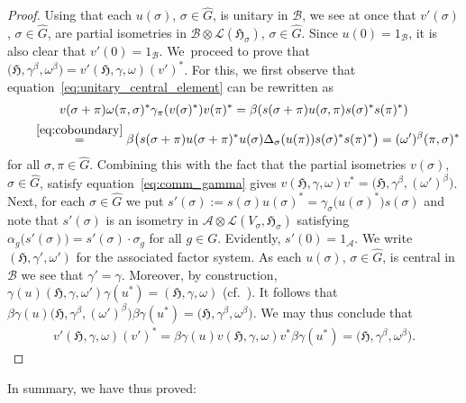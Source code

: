 \documentclass[10pt,a4paper]{amsart}
\numberwithin{equation}{section}
\newcommand*{\tensor}{\otimes}		%
\newcommand*{\hilb}{\mathfrak}		%
\newcommand*{\alg}{\mathcal}		%
\newcommand*{\hH}{\hilb{H}}			%
\newcommand*{\one}{1}				%
\newcommand*{\aA}{\alg{A}}			%
\newcommand*{\aB}{\alg{B}} 			%
\newcommand*{\End}{\mathcal{L}} %
\begin{document}
\begin{proof}
	Using that each $u(\sigma)$, $\sigma \in \hat G$, is unitary in $\aB$, we see at once that $v'(\sigma)$, $\sigma \in \hat G$, are partial isometries in $\aB \tensor \End(\hH_\sigma)$, $\sigma \in \hat G$.
	Since $u(0) = \one_\aB$, it is also clear that $v'(0) = \one_\aB$.
	We~proceed to prove that $\big(\hH, \gamma^\beta, \omega^\beta\big) = v'(\hH, \gamma, \omega)(v')^*$.
	For this, we first observe that equation~\eqref{eq:unitary_central_element} can be rewritten as
	\begin{gather*}
		v(\sigma+\pi) \omega(\pi, \sigma)^* \gamma_\pi ( v(\sigma)^* ) v(\pi)^*
		=
		\beta ( s(\sigma+\pi) u(\sigma, \pi) s(\sigma)^* s(\pi)^* )
		\\
		\qquad{} \overset{\eqref{eq:coboundary}} {=}
		\beta \bigl( s(\sigma+\pi) u(\sigma+\pi)^* u(\sigma) \Delta_\sigma ( u(\pi) ) s(\sigma)^* s(\pi)^* \bigr)
		=
		(\omega')^\beta(\pi, \sigma)^*
	\end{gather*}
	for all $\sigma, \pi \in \hat G$.
	Combining this with the fact that the partial isometries $v(\sigma)$, $\sigma \in \hat G$, satisfy equation~\eqref{eq:comm_gamma} gives $v(\hH, \gamma, \omega)v^* = \bigl( \hH, \gamma^\beta, (\omega')^\beta \bigr)$.
	Next, for each $\sigma \in \hat G$ we put $s'(\sigma) := s(\sigma) u(\sigma)^* = \gamma_\sigma \bigl( u(\sigma)^* \bigr) s(\sigma)$ and note that $s'(\sigma)$ is an isometry in $\aA \tensor \End(V_\sigma,\hH_\sigma)$ satisfying $\alpha_g\big(s'(\sigma)\big)=s'(\sigma) \cdot \sigma_g$ for all $g \in G$.
	Evidently, $s'(0) = \one_\aA$.
	We write $(\hH, \gamma', \omega')$ for the associated factor system.
	As each $u(\sigma)$, $\sigma \in \hat G$, is central in $\aB$ we see that $\gamma' = \gamma$.
	Moreover, by construction, $\gamma(u)(\hH, \gamma, \omega')\gamma(u^*) = (\hH, \gamma, \omega)$ (cf.~\cite[Lemma~4.3]{SchWa17c}).
	It follows that $\beta \gamma(u) \bigl( \hH, \gamma^\beta, (\omega')^\beta \bigr) \beta \gamma(u^*) = \big(\hH, \gamma^\beta, \omega^\beta\big)$.
	We may thus conclude that
	\begin{gather*}
		v'(\hH, \gamma, \omega) (v')^*
		= \beta \gamma(u) v (\hH, \gamma, \omega) v^* \beta \gamma(u^*)
		= \big(\hH, \gamma^\beta, \omega^\beta\big).
		\tag*{\qed}
	\end{gather*}
	\renewcommand{\qed}{}
\end{proof}

In summary, we have thus proved:
\end{document}

